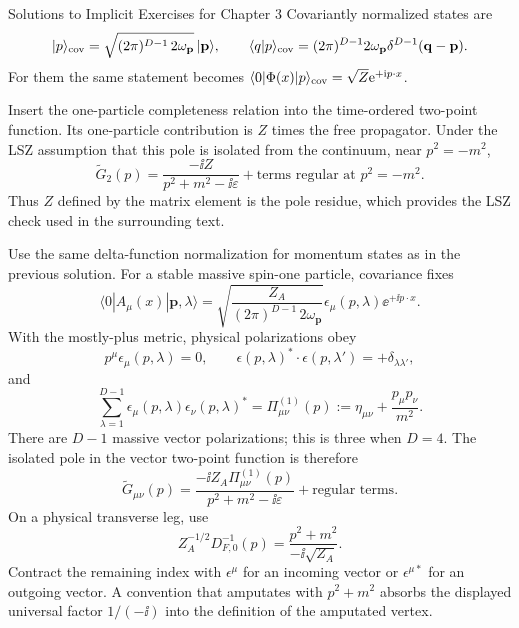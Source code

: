 \begin{bankssolutions}{Solutions to Implicit Exercises for Chapter 3}
Covariantly normalized states are
\[
 |p\rangle_{\rm cov}=\sqrt{(2\pi)^{D-1}\,2\omega_{\mathbf p}}\,|\mathbf p\rangle,
 \qquad
 \langle q|p\rangle_{\rm cov}
 =(2\pi)^{D-1}2\omega_{\mathbf p}\delta^{D-1}(\mathbf q-\mathbf p).
\]
For them the same statement becomes
\(\langle0|\Phi(x)|p\rangle_{\rm cov}
=\sqrt Z\mathrm{e}^{+\mathrm{i} p\mathbin{\cdot}x}\).

Insert the one-particle completeness relation into the time-ordered two-point
function.  Its one-particle contribution is $Z$ times the free propagator.
Under the LSZ assumption that this pole is isolated from the continuum, near
$p^2=-m^2$,
\[
 \widetilde G_2(p)=\frac{-\ii Z}{p^2+m^2-\ii\varepsilon}
 +\text{terms regular at }p^2=-m^2.
\]
Thus $Z$ defined by the matrix element is the pole residue, which provides the
LSZ check used in the surrounding text.

Use the same delta-function normalization for momentum states as in the
previous solution.  For a stable massive spin-one particle, covariance fixes
\[
 \langle0|A_\mu(x)|\mathbf p,\lambda\rangle
 =\sqrt{\frac{Z_A}{(2\pi)^{D-1}\,2\omega_{\mathbf p}}}
 \epsilon_\mu(p,\lambda)\ee^{+\ii p\mathbin{\cdot}x}.
\]
With the mostly-plus metric, physical polarizations obey
\[
 p^\mu\epsilon_\mu(p,\lambda)=0,
 \qquad
 \epsilon(p,\lambda)^*\mathbin{\cdot}\epsilon(p,\lambda')
 =+\delta_{\lambda\lambda'},
\]
and
\[
 \sum_{\lambda=1}^{D-1}\epsilon_\mu(p,\lambda)
 \epsilon_\nu(p,\lambda)^*
 =\Pi^{(1)}_{\mu\nu}(p)
 :=\eta_{\mu\nu}+\frac{p_\mu p_\nu}{m^2}.
\]
There are $D-1$ massive vector polarizations; this is three when $D=4$.
The isolated pole in the vector two-point function is therefore
\[
 \widetilde G_{\mu\nu}(p)
 =\frac{-\ii Z_A\Pi^{(1)}_{\mu\nu}(p)}
 {p^2+m^2-\ii\varepsilon}+\text{regular terms}.
\]
On a physical transverse leg, use
\[
 Z_A^{-1/2}D_{F,0}^{-1}(p)
 =\frac{p^2+m^2}{-\ii\sqrt{Z_A}}.
\]
Contract the remaining index with $\epsilon^\mu$ for an incoming vector or
$\epsilon^{\mu *}$ for an outgoing vector.  A convention that amputates with
$p^2+m^2$ absorbs the displayed universal factor $1/(-\ii)$ into the definition
of the amputated vertex.


\end{bankssolutions}
